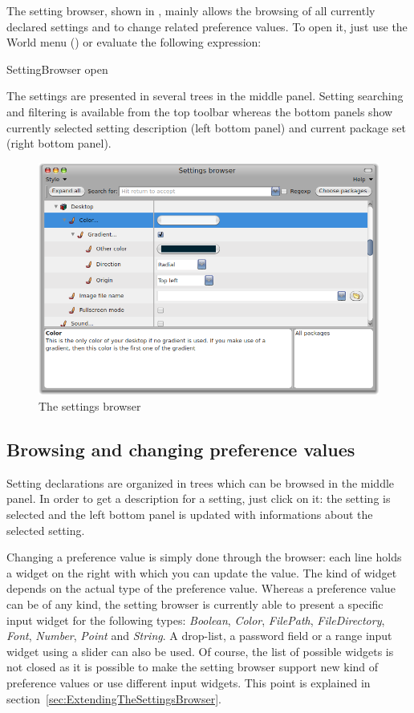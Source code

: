 \documentclass[a4paper,10pt,twoside]{book}
\begin{document}
The setting browser, shown in , mainly allows the browsing of all currently declared settings and to change related preference values. To open it, just use the World menu () or evaluate the following expression:
\begin{code}{}
SettingBrowser open
\end{code}
The settings are presented in several trees in the middle panel. Setting searching and filtering is available from the top toolbar whereas the bottom panels show currently selected setting description (left bottom panel) and current package set (right bottom panel). 
\begin{figure}[tbh]
\begin{center}
\includegraphics[scale=0.3]{SettingBrowser}
\caption{The settings browser}
\end{center}
\end{figure}

\subsection{Browsing and changing preference values}
\label{sec:browsing-settings}
Setting declarations are organized in trees which can be browsed in the middle panel. In order to get a description for a setting, just click on it: the setting is selected and the left bottom panel is updated with informations about the selected setting. 

Changing a preference value is simply done through the browser: each line holds a widget on the right with which you can update the value. The kind of widget depends on the actual type of the preference value. Whereas a preference value can be of any kind, the setting browser is currently able to present a specific input widget for the following types: \textit{Boolean}, \textit{Color}, \textit{FilePath}, \textit{FileDirectory}, \textit{Font}, \textit{Number}, \textit{Point} and \textit{String}. A drop-list, a password field or a range input widget using a slider can also be used. Of course, the list of possible widgets is not closed as it is possible to make the setting browser support new kind of preference values or use different input widgets. This point is explained in section~\ref{sec:ExtendingTheSettingsBrowser}.
\end{document}
